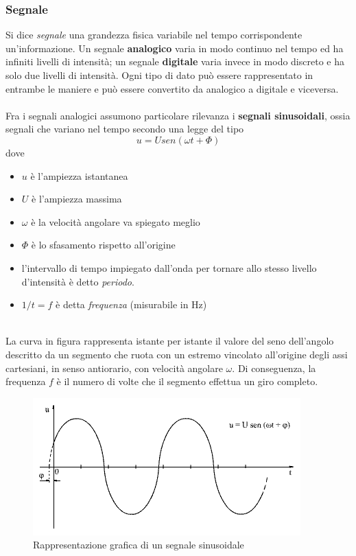 \documentclass[a4paper,11pt]{article}
\begin{document}
\subsubsection{Segnale}
Si dice \textit{segnale} una grandezza fisica variabile nel tempo corrispondente un'informazione. Un segnale \textbf{analogico} varia in modo continuo nel tempo ed ha infiniti livelli di intensità; un segnale \textbf{digitale} varia invece in modo discreto e ha solo due livelli di intensità. Ogni tipo di dato può essere rappresentato in entrambe le maniere e può essere convertito da analogico a digitale e viceversa.
\\\\Fra i segnali analogici assumono particolare rilevanza i \textbf{segnali sinusoidali}, ossia segnali che variano nel tempo secondo una legge del tipo \[u=Usen(\omega t+\Phi )\] dove 
\begin{itemize}
\item $u$ è l'ampiezza istantanea
\item $U$ è l'ampiezza massima
\item $\omega $ è la velocità angolare 
va spiegato meglio
\item $\Phi $ è lo sfasamento rispetto all'origine
\item l'intervallo di tempo impiegato dall'onda per tornare allo stesso livello d'intensità è detto \textit{periodo}.
\item $1/t=f$ è detta \textit{frequenza} (misurabile in Hz)\\\\
\end{itemize}
La curva in figura rappresenta istante per istante il valore del seno dell'angolo descritto da un segmento che ruota con un estremo vincolato all'origine degli assi cartesiani, in senso antiorario, con velocità angolare $\omega $. Di conseguenza, la frequenza $f$ è il numero di volte che il segmento effettua un giro completo.
\begin{figure}
\centering
\includegraphics[scale=0.5]{segnali_sin.png}
\caption{Rappresentazione grafica di un segnale sinusoidale}\label{fig. 1}
\end{figure}
\end{document}

